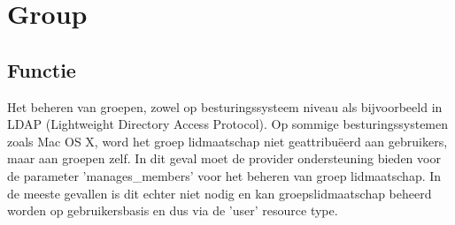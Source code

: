 \section{Group}

\subsection{Functie}
Het beheren van groepen, zowel op besturingssysteem niveau als bijvoorbeeld in LDAP (Lightweight Directory Access Protocol). Op sommige besturingssystemen zoals Mac OS X, word het groep lidmaatschap niet geattribu\"eerd aan gebruikers, maar aan groepen zelf. In dit geval moet de provider ondersteuning bieden voor de parameter 'manages\_members' voor het beheren van groep lidmaatschap. In de meeste gevallen is dit echter niet nodig en kan groepslidmaatschap beheerd worden op gebruikersbasis en dus via de 'user' resource type.

